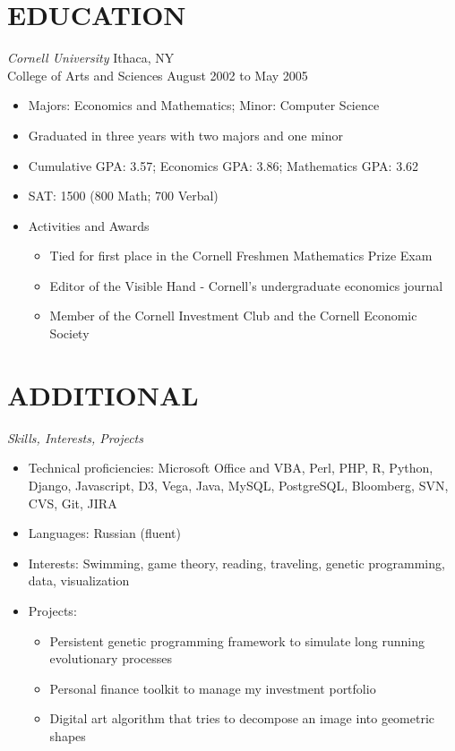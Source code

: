 \documentclass{res}
\begin{document}
\begin{resume}
\section{EDUCATION}
\vspace{3pt}
{\sl Cornell University} \hfill Ithaca, NY \\
College of Arts and Sciences \hfill August 2002 to May 2005
 \begin{itemize} \itemsep -2pt
  \item Majors: Economics and Mathematics; Minor: Computer Science
  \item Graduated in three years with two majors and one minor
  \item Cumulative GPA: 3.57; Economics GPA: 3.86; Mathematics GPA: 3.62
  \item SAT: 1500 (800 Math; 700 Verbal)
  \item Activities and Awards \vspace{-6pt}
    \begin{itemize} \itemsep -1pt
    \item Tied for first place in the Cornell Freshmen Mathematics Prize Exam
    \item Editor of the Visible Hand - Cornell's undergraduate economics journal
    \item Member of the Cornell Investment Club and the Cornell Economic Society
    \end{itemize} \vspace{0px}
\end{itemize} \vspace{-8pt}

\section{ADDITIONAL} 
\vspace{3pt}
{\sl Skills, Interests, Projects}
\begin{itemize} \itemsep -2pt
  \item Technical proficiencies: Microsoft Office and VBA, Perl, PHP, R, Python, Django, Javascript, D3, Vega, Java, MySQL, PostgreSQL, Bloomberg, SVN, CVS, Git, JIRA
  \item Languages: Russian (fluent)
  \item Interests: Swimming, game theory, reading, traveling, genetic programming, data, visualization
  \item Projects: \vspace{-6pt}
    \begin{itemize} \itemsep -2pt
    \item Persistent genetic programming framework to simulate long running evolutionary processes
    \item Personal finance toolkit to manage my investment portfolio
    \item Digital art algorithm that tries to decompose an image into geometric shapes
    \end{itemize} \vspace{0px}
\end{itemize} \vspace{0px}

\end{resume} 
\end{document}

